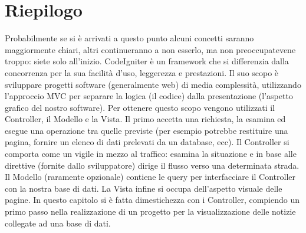 \section*{Riepilogo}
Probabilmente se si è arrivati a questo punto alcuni concetti saranno maggiormente chiari, altri continueranno a non esserlo, ma non preoccupatevene troppo: siete solo all'inizio. CodeIgniter è un framework che si differenzia dalla concorrenza per la sua facilità d'uso, leggerezza e prestazioni. Il suo scopo è sviluppare progetti software (generalmente web) di media complessità, utilizzando l'approccio \ac{MVC} per separare la logica (il codice) dalla presentazione (l'aspetto grafico del nostro software). Per ottenere questo scopo vengono utilizzati il Controller, il Modello e la Vista. Il primo accetta una richiesta, la esamina ed esegue una operazione tra quelle previste (per esempio potrebbe restituire una pagina, fornire un elenco di dati prelevati da un database, ecc). Il Controller si comporta come un vigile in mezzo al traffico: esamina la situazione e in base alle direttive (fornite dallo sviluppatore) dirige il flusso verso una determinata strada. Il Modello (raramente opzionale) contiene le query per interfacciare il Controller con la nostra base di dati. La Vista infine si occupa dell'aspetto visuale delle pagine. In questo capitolo si è fatta dimestichezza con i Controller, compiendo un primo passo nella realizzazione di un progetto per la visualizzazione delle notizie collegate ad una base di dati. 
